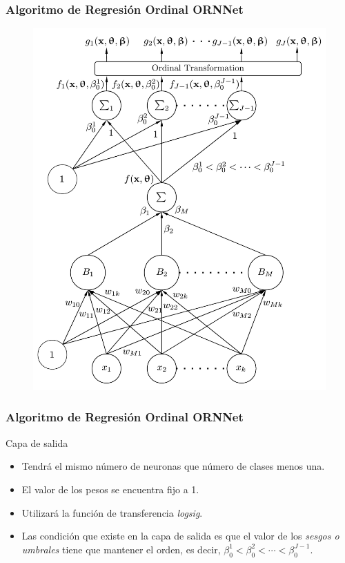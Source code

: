 \documentclass[compress,allowframebreaks]{beamer}
\begin{document}
			\begin{frame}
				\frametitle{\normalsize Algoritmo de Regresión Ordinal ORNNet}
				
				\begin{figure}[h]
					\centering
					\includegraphics[scale=0.3]{img/ORNNet.pdf}
				\end{figure}
			\end{frame}
				
			\begin{frame}
				\frametitle{\normalsize Algoritmo de Regresión Ordinal ORNNet}
				
				\begin{block}{Capa de salida}
					\begin{itemize}\justifying
						\item Tendrá el mismo número de neuronas que número de clases menos una.
						\item El valor de los pesos se encuentra fijo a 1.
						\item Utilizará la función de transferencia \textit{logsig}.
						\item Las condición que existe en la capa de salida es que el valor de los \textit{sesgos o umbrales} tiene que mantener el orden, es decir, $\beta^1_0< \beta^2_0< \cdots < \beta^{J-1}_0$.
					\end{itemize}
				\end{block}
			\end{frame}
			
\end{document}

